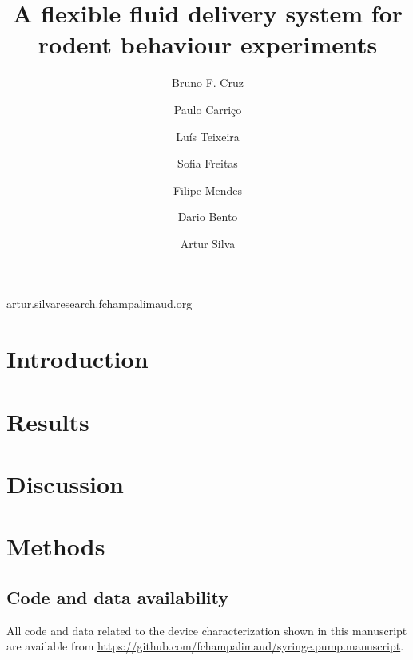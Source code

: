 
\title{A flexible fluid delivery system for rodent behaviour experiments}
\shorttitle{}

\author[1,2,3]{Bruno F. Cruz}
\author[1]{Paulo Carriço}
\author[1]{Luís Teixeira}
\author[1]{Sofia Freitas}
\author[1]{Filipe Mendes}
\author[1]{Dario Bento}
\author[1,\Letter]{Artur Silva}
\date{}

\maketitle

\begin{abstract}


\end{abstract}


\begin{corrauthor}
artur.silva\at research.fchampalimaud.org
\end{corrauthor}

\section*{Introduction}\label{s:introduction}


\section*{Results}\label{s:results}


\section*{Discussion}\label{s:discussion}


\section*{Methods}\label{s:methods}


\subsection*{Code and data availability}\label{s:code_availability}
All code and data related to the device characterization shown in this manuscript are available from \url{https://github.com/fchampalimaud/syringe.pump.manuscript}.

